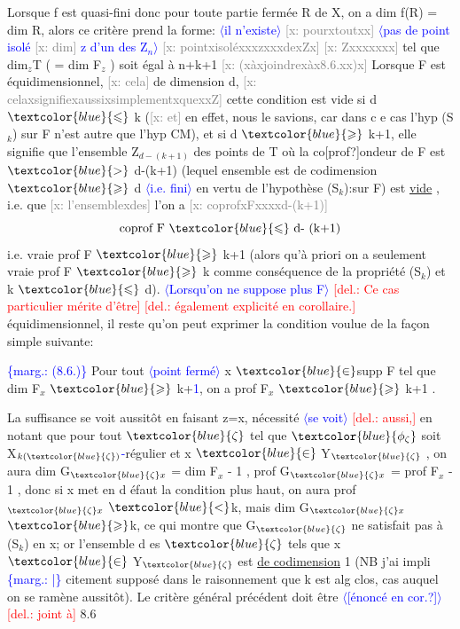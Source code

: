 \documentclass[11pt]{article}
\newcommand{\mspage}[1]{{\small\sffamily[p.\,#1]}}
\newcommand{\hand}[1]{\textcolor{blue}{#1}}
\let\over\relax
\newcommand{\over}[2]{\textcolor{gray}{#1}\textcolor{blue}{\ensuremath{^{\!\nearrow}}#2}}
\newcommand{\inserted}[2][]{\textcolor{blue}{$\langle$#2$\rangle$}}
\newcommand{\margin}[1]{\textcolor{blue}{\{\textsf{marg.:} #1\}}}
\newcommand{\deleted}[1]{\textcolor{red}{[\textsf{del.:} #1]}}
\newcommand{\xout}[1]{\textcolor{gray}{[\textsf{x:} #1]}}
\newcommand{\uline}[1]{\underline{#1}}
\newcommand{\unsure}[1]{[#1?]}
\begin{document}
Lorsque f est quasi-fini donc pour toute partie fermée R de X,
on a dim f(R) = dim R, alors ce critère prend la forme: \inserted[typed]{il n'existe} \xout{pourxtoutxx}
\inserted[typed]{pas de point isolé \xout{dim} z d'un des Z$_n$}
\xout{pointxisoléxxxzxxxdexZx} \xout{Zxxxxxxx} tel que dim$_z$T ( = dim F$_z$ ) soit égal à
n+k+1 \xout{(xàxjoindrexàx8.6.xx)x} Lorsque F est équidimensionnel, \xout{cela}
de dimension d, \xout{celaxsignifiexaussixsimplementxquexxZ} cette condition
est vide si d $\hand{\leqslant}$ k (\xout{et} en effet, nous le savions, car dans c e cas l'hyp
(S$_k$) sur F n'est autre que l'hyp CM), et si d $\hand{\geqslant}$ k+1, elle signifie
que l'ensemble Z$_{d - (k+1)}$ des points de T où la co\unsure{prof}ondeur de F est
$\hand{>}$ d-(k+1) (lequel ensemble est de codimension $\hand{\geqslant}$ d \inserted{i.e. fini} en vertu de
l'hypothèse (S$_k$):sur F) est \uline{vide} , i.e. que \xout{l'ensemblexdes}
l'on a \xout{coprofxFxxxxd-(k+1)}
\[ \text{coprof F } \hand{\leqslant} \text{ d- (k+1)} \]
i.e. vraie prof F $\hand{\geqslant}$ k+1
(alors qu'à priori on a seulement vraie prof F $\hand{\geqslant}$ k comme conséquence
de la propriété (S$_k$) et k $\hand{\leqslant}$ d). \inserted[typed]{Lorsqu'on ne suppose plus F} \deleted{Ce cas particulier mérite d'être}
\deleted{également explicité en corollaire.} équidimensionnel, il reste qu'on
peut exprimer la condition voulue de la façon simple suivante:

\margin{\hand{(8.6.)}} Pour tout \inserted{point fermé} x $\hand{\in}$supp F tel que dim F$_x$ $\hand{\geqslant}$ k+\hand{1}, on a prof F$_x$ $\hand{\geqslant}$ k+1 .

La suffisance se voit aussitôt en faisant z=x, \over{La}{la} nécessité \inserted{se voit} \deleted{aussi,} en
notant que pour tout $\hand{\zeta}$ tel que $\hand{\phi_\zeta}$ soit X$_{k(\hand{\zeta})}$\hand{-}régulier et x $\hand{\in}$ Y$_{\hand{\zeta}}$ ,
on aura dim G$_{\hand{\zeta} x}$ = dim F$_x$ - 1 , prof G$_{\hand{\zeta} x}$ = prof F$_x$ - 1 , donc si
x met en d éfaut la condition plus haut, on aura prof \over{F}{G}$_{\hand{\zeta} x}$ $\hand{<}$k, mais
dim G$_{\hand{\zeta} x}$$\hand{\geqslant}$k, ce qui montre que G$_{\hand{\zeta}}$ ne satisfait pas à (S$_k$) en x; or
l'ensemble d es $\hand{\zeta}$ tels que x$\hand{\in}$ Y$_{\hand{\zeta}}$ est \uline{de codimension} 1 (NB j'ai impli
\margin{|} citement supposé dans le raisonnement que k est alg clos, cas auquel on
se ramène aussitôt). Le critère général précédent doit être \inserted{\unsure{énoncé en cor.}} \deleted{joint à} 8.6
\mspage{36}
\end{document}
